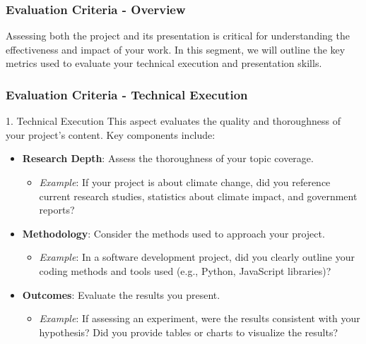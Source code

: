 \documentclass{beamer}
\begin{document}
\begin{frame}[fragile]
    \frametitle{Evaluation Criteria - Overview}
    Assessing both the project and its presentation is critical for understanding the effectiveness and impact of your work. 
    In this segment, we will outline the key metrics used to evaluate your technical execution and presentation skills.
\end{frame}

\begin{frame}[fragile]
    \frametitle{Evaluation Criteria - Technical Execution}
    \begin{block}{1. Technical Execution}
        This aspect evaluates the quality and thoroughness of your project’s content. Key components include:
        \begin{itemize}
            \item \textbf{Research Depth}: Assess the thoroughness of your topic coverage. 
            \begin{itemize}
                \item \textit{Example}: If your project is about climate change, did you reference current research studies, statistics about climate impact, and government reports?
            \end{itemize}

            \item \textbf{Methodology}: Consider the methods used to approach your project. 
            \begin{itemize}
                \item \textit{Example}: In a software development project, did you clearly outline your coding methods and tools used (e.g., Python, JavaScript libraries)?
            \end{itemize}

            \item \textbf{Outcomes}: Evaluate the results you present.
            \begin{itemize}
                \item \textit{Example}: If assessing an experiment, were the results consistent with your hypothesis? Did you provide tables or charts to visualize the results?
            \end{itemize}
        \end{itemize}
    \end{block}
\end{frame}
\end{document}
